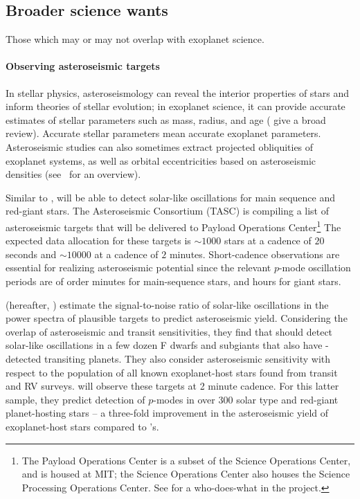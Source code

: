 \subsection{Broader science wants}
\label{sec:broader_nonexo_science}
Those which may or may not overlap with exoplanet science.

\paragraph{Observing asteroseismic targets}
\label{par:asteroseismic_disc}
In stellar physics, asteroseismology can reveal the interior properties of stars and inform theories of stellar evolution;
in exoplanet science, it can provide accurate estimates of stellar parameters such as mass, radius, and age (\citet{chaplin_asteroseismology_2013} give a broad review).
Accurate stellar parameters mean accurate exoplanet parameters.
Asteroseismic studies can also sometimes extract projected obliquities of exoplanet systems, as well as orbital eccentricities based on asteroseismic densities (see~\citet{huber_asteroseismology_2015} for an overview).

Similar to \kepler\!, \tess will be able to detect solar-like oscillations for main sequence and red-giant stars.
The \tess Asteroseismic Consortium (TASC) is compiling a list of asteroseismic targets that will be delivered to \tesss Payload Operations Center\footnote{The Payload Operations Center is a subset of the Science Operations Center, and is housed at MIT; the Science Operations Center also houses the Science Processing Operations Center. See \citet{jenkins_SPOC_2016} for a who-does-what in the \tess project.}
The expected data allocation for these targets is $\sim\!1000$ stars at a cadence of $20$ seconds and $\sim\!10000$ at a cadence of $2$ minutes.
Short-cadence observations are essential for realizing \tesss asteroseismic potential
since the relevant $p$-mode oscillation periods are of order minutes for main-sequence stars, and hours for giant stars.

\citet{campante_asteroseismic_2016} (hereafter, ) estimate the signal-to-noise ratio of solar-like oscillations in the power spectra of plausible targets to predict \tesss asteroseismic yield.
Considering the overlap of \tesss asteroseismic and transit sensitivities, they find that \tess should detect solar-like oscillations in a few dozen F dwarfs and subgiants that also have \tess\!-detected transiting planets.
They also consider \tesss asteroseismic sensitivity with respect to the population of all known exoplanet-host stars found from transit and RV surveys.
\tess will observe these targets at 2 minute cadence.
For this latter sample, they predict detection of $p$-modes in over 300 solar type and red-giant planet-hosting stars -- a three-fold improvement in the asteroseismic yield of exoplanet-host stars compared to \kepler\!'s.

